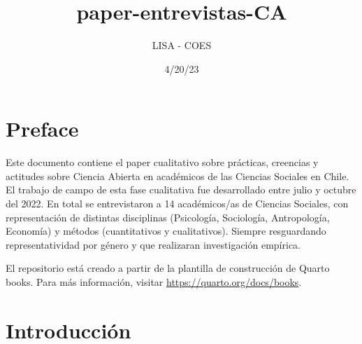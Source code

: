 \documentclass[
  letterpaper,
  DIV=11,
  numbers=noendperiod]{scrreprt}
\title{paper-entrevistas-CA}
\author{LISA - COES}
\date{4/20/23}
\renewcommand*\contentsname{Table of contents}
\newcommand\contentsname{Table of contents}
\begin{document}
\maketitle
\ifdefined\Shaded\renewenvironment{Shaded}{\begin{tcolorbox}[sharp corners, enhanced, interior hidden, borderline west={3pt}{0pt}{shadecolor}, frame hidden, boxrule=0pt, breakable]}{\end{tcolorbox}}\fi

\renewcommand*\contentsname{Table of contents}
{
\hypersetup{linkcolor=}
\setcounter{tocdepth}{2}
\tableofcontents
}

\hypertarget{preface}{%
\chapter*{Preface}\label{preface}}


Este documento contiene el paper cualitativo sobre prácticas, creencias
y actitudes sobre Ciencia Abierta en académicos de las Ciencias Sociales
en Chile. El trabajo de campo de esta fase cualitativa fue desarrollado
entre julio y octubre del 2022. En total se entrevistaron a 14
académicos/as de Ciencias Sociales, con representación de distintas
disciplinas (Psicología, Sociología, Antropología, Economía) y métodos
(cuantitativos y cualitativos). Siempre resguardando representatividad
por género y que realizaran investigación empírica.

El repositorio está creado a partir de la plantilla de construcción de
Quarto books. Para más información, visitar
\url{https://quarto.org/docs/books}.


\hypertarget{introducciuxf3n}{%
\chapter{Introducción}\label{introducciuxf3n}}
\end{document}
